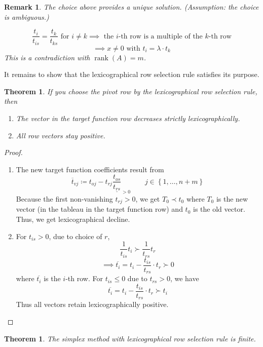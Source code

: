 \documentclass[a4paper]{article}
\newcounter{lecref}[section]
\numberwithin{lecref}{section}
\newtheorem{theorem}[lecref]{Theorem}
\newtheorem*{Remark}{Remark}
\newcommand{\Set}[1]{\left\{#1\right\}}
\begin{document}
\begin{Remark}
	The choice above provides a unique solution.
	(Assumption: the choice is ambiguous.)

	\[ \frac{t_{i}}{t_{is}} = \frac{t_k}{t_{ks}} \text{ for } i \neq k \implies \text{ the $i$-th row is a multiple of the $k$-th row} \]
	\[ \implies x \neq 0 \text{ with } t_i = \lambda \cdot t_k \]
	This is a contradiction with $\operatorname{rank}(A) = m$.
\end{Remark}

It remains to show that the lexicographical row selection rule satisfies its purpose.

\begin{theorem}
	\label{theorem:2.2}
	If you choose the pivot row by the lexicographical row selection rule, then
	\begin{enumerate}
		\item The vector in the target function row decreases strictly lexicographically.
		\item All row vectors stay positive.
	\end{enumerate}
\end{theorem}

\begin{proof}
	\begin{enumerate}
		\item The new target function coefficients result from
			\[ \overline{t}_{vj} \coloneqq t_{oj} - t_{rj} \underline{\frac{t_{os}}{t_{rs}}}_{> 0} \qquad j \in \Set{1, \dots, n+m} \]
			Because the first non-vanishing $t_{rj} > 0$, we get $T_0 \prec t_0$ where $T_0$ is the new vector (in the tableau in the target function row) and $t_0$ is the old vector.
			Thus, we get lexicographical decline.
		\item For $t_{is} > 0$, due to choice of $r$,
			\[ \frac{1}{t_{is}} t_i \succ \frac{1}{t_{rs}} t_r \]
			\[ \implies \overline{t_i} = t_i - \frac{t_{is}}{t_{rs}} \cdot t_r \succ 0 \]
			where $\overline{t_i}$ is the $i$-th row. For $t_{is} \leq 0$ due to $t_{rs} > 0$, we have
			\[ \overline{t_i} = t_i - \frac{t_{is}}{t_{rs}} \cdot t_r \succ t_i \]
			Thus all vectors retain lexicographically positive.
	\end{enumerate}
\end{proof}

\begin{theorem}
	\label{theorem:2.3}
	The simplex method with lexicographical row selection rule is finite.
\end{theorem}
\end{document}
